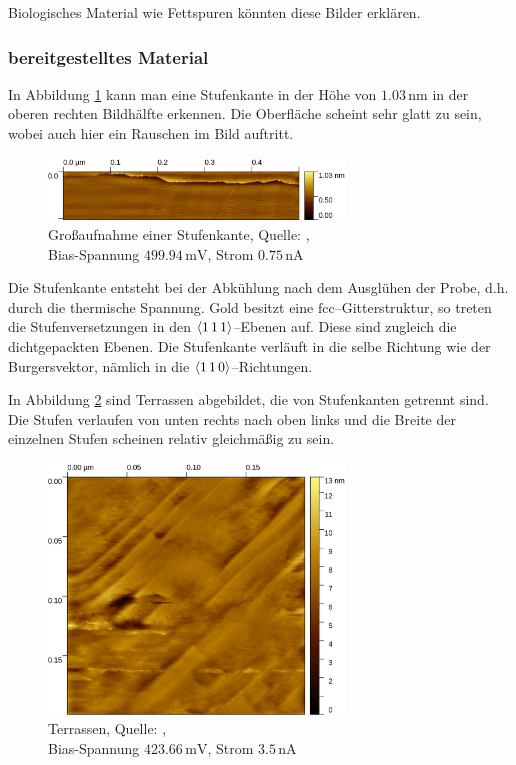 \documentclass[12pt,a4paper]{scrartcl}
\numberwithin{equation}{section} %
\begin{document}
Biologisches Material wie Fettspuren könnten diese Bilder erklären.

\newpage
\hypertarget{bereitgestelltes-material}{%
\subsubsection{bereitgestelltes
Material}\label{bereitgestelltes-material}}

In Abbildung \ref{abb:Gold Stufenkante} kann man eine Stufenkante in der Höhe von $1.03\mathrm{\,nm}$ in der oberen rechten Bildhälfte erkennen. Die Oberfläche scheint sehr glatt zu sein, wobei auch hier ein Rauschen im Bild auftritt.

\begin{figure}[ht]
	\centering
	\includegraphics[width=0.7\textwidth]{../media/B2.5/Stufenkante.pdf}
	\caption{Großaufnahme einer Stufenkante, Quelle: \cite{Grover}, \\
			Bias-Spannung $499.94 \mathrm{\,mV}$, Strom $0.75 \mathrm{\,nA}$}
	\label{abb:Gold Stufenkante}
\end{figure}

Die Stufenkante entsteht bei der Abkühlung nach dem Ausglühen der Probe, d.h. durch die thermische Spannung. Gold besitzt eine $\mathrm{fcc}$--Gitterstruktur, so treten die Stufenversetzungen in den $\expval{1\,1\,1}$--Ebenen auf. Diese sind zugleich die dichtgepackten Ebenen. Die Stufenkante verläuft in die selbe Richtung wie der Burgersvektor, nämlich in die $\expval{1\,1\,0}$--Richtungen.

In Abbildung \ref{abb:Gold terassen} sind Terrassen abgebildet, die von Stufenkanten getrennt sind. Die Stufen verlaufen von unten rechts nach oben links und die Breite der einzelnen Stufen scheinen relativ gleichmäßig zu sein.

\begin{figure}[ht]
	\centering
	\includegraphics[width=0.7\textwidth]{../media/B2.5/Gold.pdf}
	\caption{Terrassen, Quelle: \cite{Grover}, \\
			Bias-Spannung $423.66 \mathrm{\,mV}$, Strom $3.5 \mathrm{\,nA}$}
	\label{abb:Gold terassen}
\end{figure}
\end{document}
